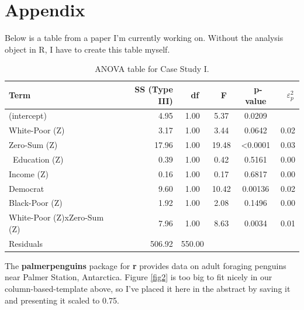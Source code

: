 \documentclass{article}\usepackage[]{graphicx}\usepackage[]{xcolor}
\begin{document}
\begin{multicols}{2}
\begin{quote}
\end{quote}
\vspace{2em}


\begin{tiny}

\end{tiny}
\end{multicols}

\newpage
\onecolumn
\section{Appendix}
\noindent Below is a table from a paper I’m currently working on. Without the analysis object in R, I have to create this table myself.\\
\begin{table}[H]
\begin{center}
\begin{tabular}{lrcccc}\\\hline
Term & \ SS (Type III) & \ df & \ F & \ p-value & \ $\varepsilon_p^2$ \\\hline
(intercept) &4.95 &1.00 &5.37 &0.0209\\    
White-Poor (Z) &3.17 &1.00 &3.44 &0.0642 &0.02\\
Zero-Sum (Z) &17.96 &1.00 &19.48 &<0.0001 &0.03\\\
Education (Z) &0.39 &1.00 &0.42 &0.5161 &0.00\\
Income (Z) &0.16 &1.00 &0.17 &0.6817 &0.00\\
Democrat &9.60 &1.00 &10.42 &0.00136 &0.02\\
Black-Poor (Z) &1.92 &1.00 &2.08 &0.1496 &0.00\\
White-Poor (Z)xZero-Sum (Z) &7.96 &1.00 &8.63 &0.0034 &0.01\\
Residuals &506.92 &550.00\\\hline
\end{tabular} 
\caption{ANOVA table for Case Study I.}
\label{anova.tab}
\end{center}
\end{table}
The \textbf{palmerpenguins} package for \textbf{r} \citep{palmerpenguins} provides data on adult foraging penguins near Palmer Station, Antarctica. Figure \ref{fig2} is too big to fit nicely in our column-based-template above, so I’ve placed it here in the abstract by saving it and presenting it scaled to 0.75.
\end{document}

